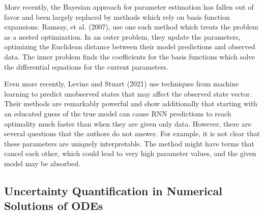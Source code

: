 \documentclass[12pt]{article}
\begin{document}

More recently, the Bayesian approach for parameter estimation has fallen out of favor and been largely replaced by methods which rely on basis function expansions. Ramsay, et al. (2007), use one such method which treats the problem as a nested optimization. In an outer problem, they update the parameters, optimizing the Euclidean distance between their model predictions and observed data. The inner problem finds the coefficients for the basis functions which solve the differential equations for the current parameters.\cite{ramsay}

Even more recently, Levine and Stuart (2021) use techniques from machine learning to predict unobserved states that may affect the observed state vector. Their methods are remarkably powerful and show additionally that starting with an educated guess of the true model can cause RNN predictions to reach optimality much faster than when they are given only data.\cite{levine} However, there are several questions that the authors do not answer. For example, it is not clear that these parameters are uniquely interpretable. The method might have terms that cancel each other, which could lead to very high parameter values, and the given model may be absorbed.



\subsection{Uncertainty Quantification in Numerical Solutions of ODEs}
\end{document}
